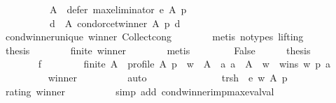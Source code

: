 \begin{isabellebody}
\ \ \ \ \ \ \ \ \ \ A\ {\isacharminus}{\kern0pt}\ defer\ {\isacharparenleft}{\kern0pt}max{\isacharunderscore}{\kern0pt}eliminator\ e{\isacharparenright}{\kern0pt}\ A\ p{\isacharcomma}{\kern0pt}\isanewline
\ \ \ \ \ \ \ \ \ \ {\isacharbraceleft}{\kern0pt}d\ {\isasymin}\ A{\isachardot}{\kern0pt}\ condorcet{\isacharunderscore}{\kern0pt}winner\ A\ p\ d{\isacharbraceright}{\kern0pt}{\isacharparenright}{\kern0pt}{\isachardoublequoteclose}\isanewline
\ \ \ \ \ \ \isamarkupfalse%
\ cond{\isacharunderscore}{\kern0pt}winner{\isacharunderscore}{\kern0pt}unique{}\ winner\ Collect{\isacharunderscore}{\kern0pt}cong\isanewline
\ \ \ \ \ \ \isamarkupfalse%
\ {\isacharparenleft}{\kern0pt}metis\ {\isacharparenleft}{\kern0pt}no{\isacharunderscore}{\kern0pt}types{\isacharcomma}{\kern0pt}\ lifting{\isacharparenright}{\kern0pt}{\isacharparenright}{\kern0pt}\isanewline
\ \ \ \ \isamarkupfalse%
\ \isamarkupfalse%
\ {\isacharquery}{\kern0pt}thesis\isanewline
\ \ \ \ \ \ \isamarkupfalse%
\ finite\ winner\isanewline
\ \ \ \ \ \ \isamarkupfalse%
\ metis\isanewline
\ \ \isamarkupfalse%
\isanewline
\ \ \ \ \isamarkupfalse%
\ False\isanewline
\ \ \ \ \isamarkupfalse%
\ {\isacharquery}{\kern0pt}thesis\isanewline
\ \ \ \ \isamarkupfalse%
\ {\isacharminus}{\kern0pt}\isanewline
\ \ \ \ \ \ \isamarkupfalse%
\ f{}{\isacharcolon}{\kern0pt}\isanewline
\ \ \ \ \ \ \ \ {\isachardoublequoteopen}finite\ A\ {\isasymand}\ profile\ A\ p\ {\isasymand}\ w\ {\isasymin}\ A\ {\isasymand}\ {\isacharparenleft}{\kern0pt}{\isasymforall}a{\isachardot}{\kern0pt}\ a\ {\isasymnotin}\ A\ {\isacharminus}{\kern0pt}\ {\isacharbraceleft}{\kern0pt}w{\isacharbraceright}{\kern0pt}\ {\isasymor}\ wins\ w\ p\ a{\isacharparenright}{\kern0pt}{\isachardoublequoteclose}\isanewline
\ \ \ \ \ \ \ \ \isamarkupfalse%
\ winner\isanewline
\ \ \ \ \ \ \ \ \isamarkupfalse%
\ auto\isanewline
\ \ \ \ \ \ \isamarkupfalse%
\isanewline
\ \ \ \ \ \ \ \ {\isachardoublequoteopen}{\isacharquery}{\kern0pt}trsh\ {\isacharequal}{\kern0pt}\ e\ w\ A\ p{\isachardoublequoteclose}\isanewline
\ \ \ \ \ \ \ \ \isamarkupfalse%
\ rating\ winner\isanewline
\ \ \ \ \ \ \ \ \isamarkupfalse%
\ {\isacharparenleft}{\kern0pt}simp\ add{\isacharcolon}{\kern0pt}\ cond{\isacharunderscore}{\kern0pt}winner{\isacharunderscore}{\kern0pt}imp{\isacharunderscore}{\kern0pt}max{\isacharunderscore}{\kern0pt}eval{\isacharunderscore}{\kern0pt}val{\isacharparenright}{\kern0pt}\isanewline

\end{isabellebody}
